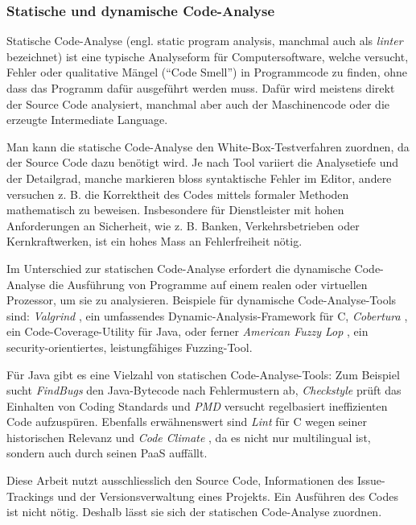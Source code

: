 \documentclass[10pt, a4paper]{article}
\begin{document}
\subsubsection{Statische und dynamische Code-Analyse}
Statische Code-Analyse (engl. static program analysis, manchmal auch als \emph{linter} bezeichnet) ist eine typische Analyseform für Computersoftware, welche versucht, Fehler oder qualitative Mängel (``Code Smell'') in Programmcode zu finden, ohne dass das Programm dafür ausgeführt werden muss. Dafür wird meistens direkt der Source Code analysiert, manchmal aber auch der Maschinencode oder die erzeugte Intermediate Language.

Man kann die statische Code-Analyse den White-Box-Testverfahren zuordnen, da der Source Code dazu benötigt wird. Je nach Tool variiert die Analysetiefe und der Detailgrad, manche markieren bloss syntaktische Fehler im Editor, andere versuchen z. B. die Korrektheit des Codes mittels formaler Methoden mathematisch zu beweisen. Insbesondere für Dienstleister mit hohen Anforderungen an Sicherheit, wie z. B. Banken, Verkehrsbetrieben oder Kernkraftwerken, ist ein hohes Mass an Fehlerfreiheit nötig.

Im Unterschied zur statischen Code-Analyse erfordert die dynamische Code-Analyse die Ausführung von Programme auf einem realen oder virtuellen Prozessor, um sie zu analysieren. Beispiele für dynamische Code-Analyse-Tools sind: \emph{Valgrind} \cite{valgrind}, ein umfassendes Dynamic-Analysis-Framework für C, \emph{Cobertura} \cite{cobertura}, ein Code-Coverage-Utility für Java, oder ferner \emph{American Fuzzy Lop} \cite{amf}, ein security-orientiertes, leistungfähiges Fuzzing-Tool.

Für Java gibt es eine Vielzahl von statischen Code-Analyse-Tools: Zum Beispiel sucht \emph{FindBugs} \cite{findbugs} den Java-Bytecode nach Fehlermustern ab, \emph{Checkstyle} \cite{checkstyle} prüft das Einhalten von Coding Standards und \emph{PMD} \cite{pmd} versucht regelbasiert ineffizienten Code aufzuspüren. Ebenfalls erwähnenswert sind \emph{Lint} \cite{lint} für C wegen seiner historischen Relevanz und \emph{Code Climate} \cite{codeclimate}, da es nicht nur multilingual ist, sondern auch durch seinen \ac{PaaS} auffällt.

Diese Arbeit nutzt ausschliesslich den Source Code, Informationen des Issue-Trackings und der Versionsverwaltung eines Projekts. Ein Ausführen des Codes ist nicht nötig. Deshalb lässt sie sich der statischen Code-Analyse zuordnen. 
\end{document}
